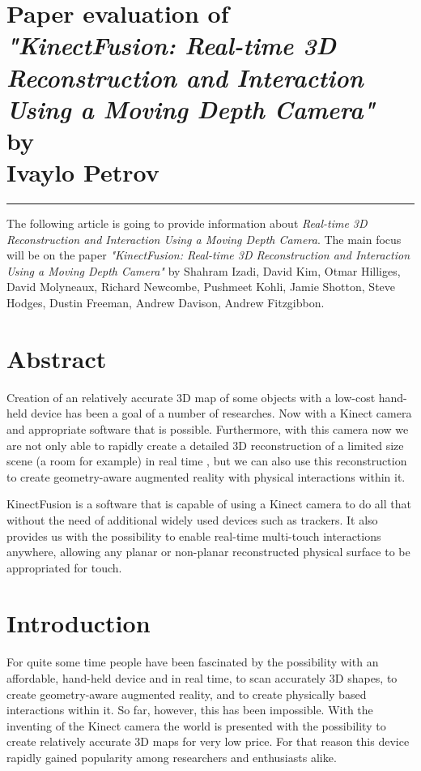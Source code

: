 \documentclass[12pt, a4paper]{article}
\newcommand{\hr}{\rule{\linewidth}{0.1mm}}
\theoremstyle{plain}
\begin{document}


\section*{\centering
  Paper evaluation of\\
  \emph{"KinectFusion: Real-time 3D Reconstruction and Interaction Using a
    Moving Depth Camera"}\\
  by\\
  Ivaylo Petrov
}

\hr

The following article is going to provide information about \emph{Real-time 3D
Reconstruction and Interaction Using a Moving Depth Camera}. The main focus 
will be on the paper \emph{"KinectFusion: Real-time 3D Reconstruction and
Interaction Using a Moving Depth Camera"} by Shahram Izadi, David Kim,
Otmar Hilliges, David Molyneaux, Richard Newcombe, Pushmeet Kohli,
Jamie Shotton, Steve Hodges, Dustin Freeman, Andrew Davison, Andrew Fitzgibbon.

\section{Abstract} %
\label{sec:Abstract}
  Creation of an relatively accurate 3D map of some objects with a low-cost 
  hand-held device has been a goal of a number of researches. Now with a Kinect
  camera and appropriate software that is possible. Furthermore, with this 
  camera now we are not only able to rapidly create a detailed 3D reconstruction
  of a limited size scene (a room for example) in real time \cite{kinectfusion},
  but we can also use this reconstruction to create geometry-aware augmented
  reality with physical interactions within it. 

  KinectFusion is a software that is capable of using a Kinect camera to do all
  that without the need of additional widely used devices such as trackers. It
  also provides us with the possibility to enable real-time multi-touch
  interactions anywhere, allowing any planar or non-planar reconstructed
  physical surface to be appropriated for touch.

\section{Introduction} %
\label{sec:Introduction}
  For quite some time people have been fascinated by the possibility with an 
  affordable, hand-held device and in real time, to scan accurately 3D shapes,  
  to create geometry-aware augmented reality, and to create physically based
  interactions within it. So far, however, this has been impossible. With the
  inventing of the Kinect camera the world is presented with the possibility to
  create relatively accurate 3D maps for very low price. For that reason this
  device rapidly gained popularity among researchers and enthusiasts alike.
\end{document}
